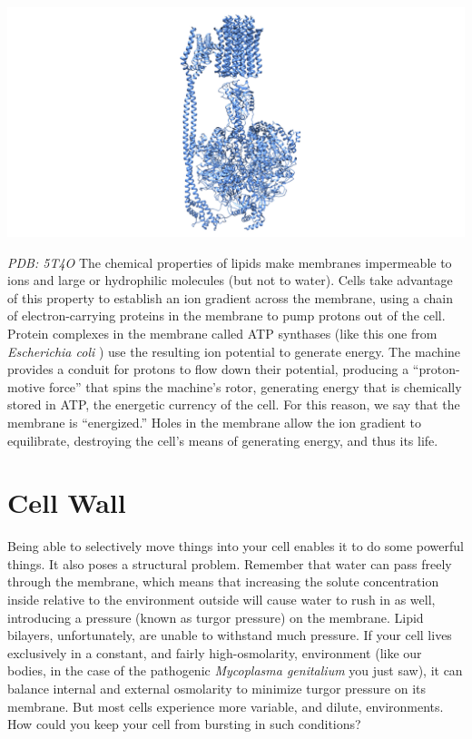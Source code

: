 \documentclass[]{tufte-book}
\begin{document}
\includegraphics{img/schematics/2_1_2}

\emph{PDB: 5T4O} The chemical properties of lipids make membranes
impermeable to ions and large or hydrophilic molecules (but not to
water). Cells take advantage of this property to establish an ion
gradient across the membrane, using a chain of electron-carrying
proteins in the membrane to pump protons out of the cell. Protein
complexes in the membrane called ATP synthases (like this one from
\emph{Escherichia coli} \citep{sobti2016}) use the resulting ion
potential to generate energy. The machine provides a conduit for protons
to flow down their potential, producing a ``proton-motive force'' that
spins the machine's rotor, generating energy that is chemically stored
in ATP, the energetic currency of the cell. For this reason, we say that
the membrane is ``energized.'' Holes in the membrane allow the ion
gradient to equilibrate, destroying the cell's means of generating
energy, and thus its life.

\section{Cell Wall}\label{cell-wall}

Being able to selectively move things into your cell enables it to do
some powerful things. It also poses a structural problem. Remember that
water can pass freely through the membrane, which means that increasing
the solute concentration inside relative to the environment outside will
cause water to rush in as well, introducing a pressure (known as turgor
pressure) on the membrane. Lipid bilayers, unfortunately, are unable to
withstand much pressure. If your cell lives exclusively in a constant,
and fairly high-osmolarity, environment (like our bodies, in the case of
the pathogenic \emph{Mycoplasma genitalium} you just saw), it can
balance internal and external osmolarity to minimize turgor pressure on
its membrane. But most cells experience more variable, and dilute,
environments. How could you keep your cell from bursting in such
conditions?
\end{document}
